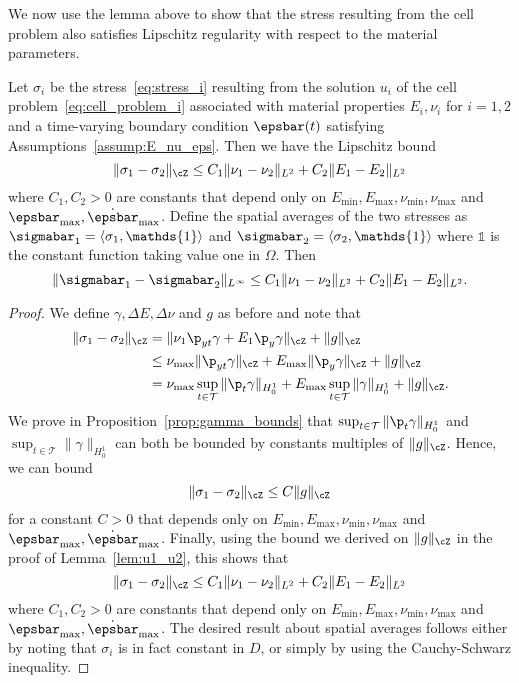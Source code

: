 \documentclass[letterpaper,11pt]{article}
\begin{document}
We now use the lemma above to show that the stress resulting from the cell problem also satisfies Lipschitz regularity with respect to the material parameters.

\begin{lemma}\label{lem:sigma1_sigma2}
Let $\sigma_i$ be the stress~\eqref{eq:stress_i} resulting from the solution $u_i$ of the cell problem~\eqref{eq:cell_problem_i} associated with material properties $E_i, \nu_i$ for $i = 1, 2$ and a time-varying boundary condition $\epsbar(t)$ satisfying Assumptions~\ref{assump:E_nu_eps}. Then we have the Lipschitz bound
\begin{equation}
    \|\sigma_1 - \sigma_2\|_\cZ \leq C_1\|\nu_1 - \nu_2\|_{L^2} + C_2\|E_1 - E_2\|_{L^2}
\end{equation}
where $C_1, C_2 > 0$ are constants that depend only on $E_{\min}, E_{\max}, \nu_{\min}, \nu_{\max}$ and $\epsbar_{\max}, \dot{\epsbar}_{\max}$.
Define the spatial averages of the two stresses as $\sigmabar_1 = \langle\sigma_1, \mathds{1}\rangle$ and $\sigmabar_2 = \langle\sigma_2, \mathds{1}\rangle$ where $\mathds{1}$ is the constant function taking value one in $\Omega$. Then
\begin{equation}
        \|\sigmabar_1 - \sigmabar_2\|_{L^\infty} \leq C_1\|\nu_1 - \nu_2\|_{L^2} + C_2\|E_1 - E_2\|_{L^2}.
    \end{equation}
\end{lemma}
\begin{proof}
We define $\gamma, \Delta E, \Delta\nu$ and $g$ as before and note that
    \begin{align*}
        \|\sigma_1 - \sigma_2\|_\cZ &= \|\nu_1\p_{yt}\gamma + E_1\p_y\gamma\|_\cZ + \|g\|_\cZ\\
        &\leq \nu_{\max}\|\p_{yt}\gamma\|_\cZ + E_{\max}\|\p_y\gamma\|_\cZ + \|g\|_\cZ\\
        &= \nu_{\max}\sup_{t \in \mathcal{T}}\|\p_t\gamma\|_{H_0^1} + E_{\max}\sup_{t \in \mathcal{T}}\|\gamma\|_{H_0^1} + \|g\|_\cZ.
    \end{align*}
    We prove in Proposition~\ref{prop:gamma_bounds} that $\sup_{t \in \mathcal{T}}\|\p_t\gamma\|_{H_0^1}$ and $\sup_{t \in \mathcal{T}}\|\gamma\|_{H_0^1}$ can both be bounded by constants multiples of $\|g\|_\cZ$. Hence, we can bound
    \begin{equation}
        \|\sigma_1 - \sigma_2\|_\cZ \leq C\|g\|_\cZ
    \end{equation}
    for a constant $C > 0$ that depends only on $E_{\min}, E_{\max}, \nu_{\min}, \nu_{\max}$ and $\epsbar_{\max}, \dot{\epsbar}_{\max}$. Finally, using the bound we derived on $\|g\|_\cZ$ in the proof of Lemma~\ref{lem:u1_u2}, this shows that
    \begin{equation}
        \|\sigma_1 - \sigma_2\|_\cZ \leq C_1\|\nu_1 - \nu_2\|_{L^2} + C_2\|E_1 - E_2\|_{L^2}
    \end{equation}
    where $C_1, C_2 > 0$ are constants that depend only on $E_{\min}, E_{\max}, \nu_{\min}, \nu_{\max}$ and $\epsbar_{\max}, \dot{\epsbar}_{\max}$.
    The desired result about spatial averages follows either by noting that
    $\sigma_i$ is in fact constant in $D$, or simply by using the Cauchy-Schwarz
    inequality.
\end{proof}
\end{document}
